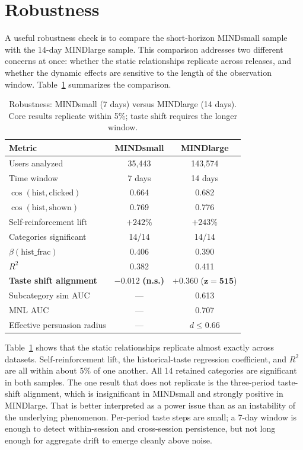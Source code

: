 \documentclass[11pt]{article}
\begin{document}
\section{Robustness}

A useful robustness check is to compare the short-horizon MINDsmall sample with the 14-day MINDlarge sample. This comparison addresses two different concerns at once: whether the static relationships replicate across releases, and whether the dynamic effects are sensitive to the length of the observation window. Table~\ref{tab:robustness} summarizes the comparison.

\begin{table}[ht]
\centering
\caption{Robustness: MINDsmall (7 days) versus MINDlarge (14 days). Core results replicate within 5\%; taste shift requires the longer window.}
\label{tab:robustness}
\begin{tabular}{lcc}
\toprule
Metric & MINDsmall & MINDlarge \\
\midrule
Users analyzed & 35,443 & 143,574 \\
Time window & 7 days & 14 days \\
$\cos(\text{hist}, \text{clicked})$ & 0.664 & 0.682 \\
$\cos(\text{hist}, \text{shown})$ & 0.769 & 0.776 \\
Self-reinforcement lift & $+242\%$ & $+243\%$ \\
Categories significant & 14/14 & 14/14 \\
$\beta(\text{hist\_frac})$ & 0.406 & 0.390 \\
$R^2$ & 0.382 & 0.411 \\
\textbf{Taste shift alignment} & $\boldsymbol{-0.012}$ \textbf{(n.s.)} & $\boldsymbol{+0.360}$ ($\boldsymbol{z = 515}$) \\
Subcategory sim AUC & --- & 0.613 \\
MNL AUC & --- & 0.707 \\
Effective persuasion radius & --- & $d \leq 0.66$ \\
\bottomrule
\end{tabular}
\end{table}
\FloatBarrier

Table~\ref{tab:robustness} shows that the static relationships replicate almost exactly across datasets. Self-reinforcement lift, the historical-taste regression coefficient, and $R^2$ are all within about 5\% of one another. All 14 retained categories are significant in both samples. The one result that does not replicate is the three-period taste-shift alignment, which is insignificant in MINDsmall and strongly positive in MINDlarge. That is better interpreted as a power issue than as an instability of the underlying phenomenon. Per-period taste steps are small; a 7-day window is enough to detect within-session and cross-session persistence, but not long enough for aggregate drift to emerge cleanly above noise.
\end{document}
